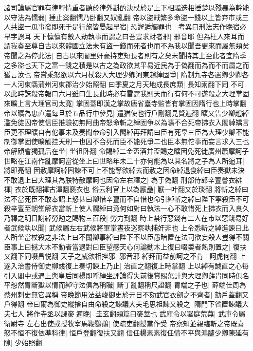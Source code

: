 諸司論屬官罪有律輕情重者聽於律外斟酌決杖於是上下相驅迭相捶楚以殘暴為幹能以守法為懦弱|{
	捶止橤翻懦乃卧翻又奴亂翻}
帝以盜賊繁多命盜一錢以上皆弃市或三人共盜一瓜事發即死于是行旅皆晏起早宿|{
	恐邂逅觸罪也　考異曰刑法志作晩宿必早字誤耳}
天下懔懔有數人劫執事而謂之曰吾豈求財者邪|{
	邪音耶}
但為枉人來耳而謂我奏至尊自古以來體國立法未有盜一錢而死者也而不為我以聞吾更來而屬無類矣帝聞之為停此法|{
	自古以來閭里奸豪持吏短長者則有之矣未聞持其上至此者宜隋季之多盜也天下之富一錢之積是以古之為政欲其平易近民為于偽翻而為而不而屬之而猶言汝也}
帝嘗乘怒欲以六月杖殺人大理少卿河東趙綽固爭|{
	隋制九寺各置卿少卿各一人河東縣蒲州河東郡治少始照翻}
曰季夏之月天地成長庶類|{
	長知兩翻下同}
不可以此時誅殺帝報曰六月雖曰生長此時必有雷霆我則天而行有何不可遂殺之大理掌固來曠上言大理官司太寛|{
	掌固蓋即漢之掌故唐省臺寺監皆有掌固因隋行也上時掌翻}
帝以曠為忠直遣每旦於五品行中參見|{
	遣猶使也行戶剛翻見賢遍翻}
曠又告少卿趙綽濫免徒囚帝使信臣推驗初無阿曲帝怒命斬之綽固争以為曠不合死帝拂衣入閣綽矯言臣更不理曠自有佗事未及奏聞帝命引入閣綽再拜請曰臣有死辠三臣為大理少卿不能制御掌固使曠觸挂天刑一也囚不合死而臣不能死爭二也臣本無佗事而妄言求入三也帝解顔會獨孤后在坐|{
	坐徂卧翻}
命賜綽二金盃酒并盃賜之曠因免死徙廣州蕭摩訶子世略在江南作亂摩訶當從坐上曰世略年未二十亦何能為以其名將之子為人所逼耳|{
	將即亮翻}
因赦摩訶綽固諫不可上不能奪欲綽去而赦之因命綽退食綽曰臣奏獄未決不敢退上曰大理其為朕特赦摩訶也因命左右釋之|{
	為于偽翻}
刑部侍郎辛亶嘗衣緋褌|{
	衣於既翻褌古渾翻褻衣也}
俗云利官上以為厭蠱|{
	厭一叶翻又於琰翻}
將斬之綽曰法不當死臣不敢奉詔上怒甚曰卿惜辛亶而不自惜也命引綽斬之綽曰陛下寜殺臣不可殺辛亶至朝堂解衣當斬上使人謂綽曰竟何如對曰執法一心不敢惜死上拂衣而入良久乃釋之明日謝綽勞勉之賜物三百段|{
	勞力到翻}
時上禁行惡錢有二人在市以惡錢易好者武候執以聞|{
	武候屬左右武候將軍掌晝夜巡察執捕奸非也}
上令悉斬之綽進諫曰此人所坐當杖殺之非法上曰不關卿事綽曰陛下不以臣愚暗置在法司欲妄殺人豈得不關臣事上曰撼大木不動者當退對曰臣望感天心何論動木上復曰啜羮者熱則置之|{
	復扶又翻下同啜昌悦翻}
天子之威欲相挫邪|{
	邪音耶}
綽拜而益前訶之不肯|{
	訶虎何翻}
上遂入治書侍御史柳彧復上奏切諫上乃止|{
	治直之翻復上時掌翻}
上以綽有誠直之心每引入閣中或遇上與皇后同榻即呼綽坐評論得失前後賞賜萬計與大理卿薛胄同時俱名平恕然胄斷獄以情而綽守法俱為稱職|{
	斷丁亂翻稱尺證翻}
胄端之子也|{
	薛端仕周為蔡州刺史無它異稱}
帝晩節用法益峻御史於元日不劾武官衣劒之不齊者|{
	劾戶蓋翻又戶得翻}
帝曰爾為御史縱捨自由命殺之諫議大夫毛思祖諫又殺之|{
	隋門下省置諫議大夫七人}
將作寺丞以課麥遲晚|{
	圭玄翻類篇曰麥莖也}
武庫令以署庭荒蕪|{
	武庫令屬衛尉寺}
左右出使或授牧宰馬鞭鸚鵡|{
	使疏吏翻授當作受}
帝察知並親臨斬之帝既喜怒不恒不復依凖科律|{
	恒戶登翻復扶又翻}
信任楊素素復任情不平與鴻臚少卿陳延有隙|{
	少始照翻}
